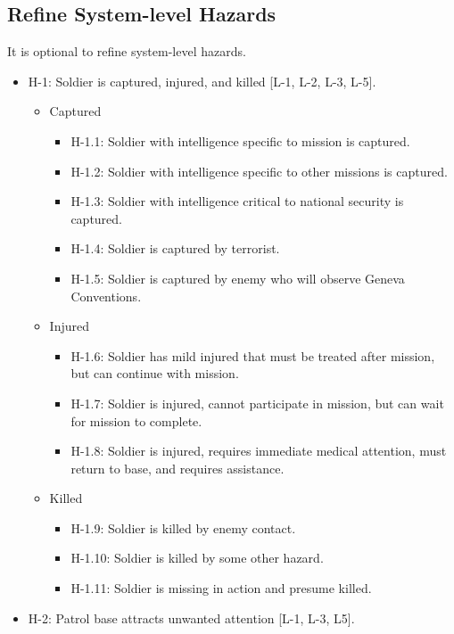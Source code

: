 \documentclass[../../main/main.tex]{subfiles}
\begin{document}
\subsection{Refine System-level Hazards}
It is optional to refine system-level hazards.  

\begin{itemize}
\item H-1: Soldier is captured, injured, and killed [L-1, L-2, L-3, L-5].\\
\begin{itemize}
\item Captured

\begin{itemize}
\item H-1.1: Soldier with intelligence specific to mission is captured.
\item H-1.2: Soldier with intelligence specific to other missions is captured.
\item H-1.3: Soldier with intelligence critical to national security is captured.
\item H-1.4: Soldier is captured by terrorist.
\item H-1.5: Soldier is captured by enemy who will observe Geneva Conventions.
\end{itemize}

\item Injured
\begin{itemize}
\item H-1.6: Soldier has mild injured that must be treated after mission, but can continue with mission.
\item H-1.7: Soldier is injured, cannot participate in mission, but can wait for mission to complete.
\item H-1.8: Soldier is injured, requires immediate medical attention, must return to base, and requires assistance.
\end{itemize}

\item Killed
\begin{itemize}
\item H-1.9: Soldier is killed by enemy contact.
\item H-1.10: Soldier is killed by some other hazard.
\item H-1.11: Soldier is missing in action and presume killed.
\end{itemize}
\end{itemize}

\item H-2: Patrol base attracts unwanted attention [L-1, L-3, L5].\\


\end{itemize}
\end{document}
